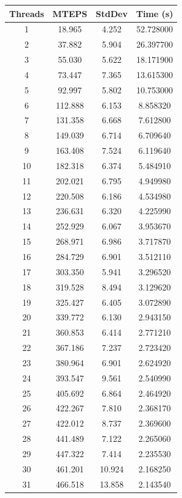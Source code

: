 \documentclass[10pt,twocolumn,letterpaper]{article}
\begin{document}
\begin{table}[h]
\renewcommand\arraystretch{0.8}
\centering
\begin{tabular}{@{}c|ccc@{}}
\toprule
Threads          & MTEPS  & StdDev     & Time (s)      \\ \midrule
1 & 18.965 & 4.252 & 52.728000 \\
2 & 37.882 & 5.904 & 26.397700 \\
3 & 55.030 & 5.622 & 18.171900 \\
4 & 73.447 & 7.365 & 13.615300 \\
5 & 92.997 & 5.802 & 10.753000 \\
6 & 112.888 & 6.153 & 8.858320 \\
7 & 131.358 & 6.668 & 7.612800 \\
8 & 149.039 & 6.714 & 6.709640 \\
9 & 163.408 & 7.524 & 6.119640 \\
10 & 182.318 & 6.374 & 5.484910 \\
11 & 202.021 & 6.795 & 4.949980 \\
12 & 220.508 & 6.186 & 4.534980 \\
13 & 236.631 & 6.320 & 4.225990 \\
14 & 252.929 & 6.067 & 3.953670 \\
15 & 268.971 & 6.986 & 3.717870 \\
16 & 284.729 & 6.901 & 3.512110 \\
17 & 303.350 & 5.941 & 3.296520 \\
18 & 319.528 & 8.494 & 3.129620 \\
19 & 325.427 & 6.405 & 3.072890 \\
20 & 339.772 & 6.130 & 2.943150 \\
21 & 360.853 & 6.414 & 2.771210 \\
22 & 367.186 & 7.237 & 2.723420 \\
23 & 380.964 & 6.901 & 2.624920 \\
24 & 393.547 & 9.561 & 2.540990 \\
25 & 405.692 & 6.864 & 2.464920 \\
26 & 422.267 & 7.810 & 2.368170 \\
27 & 422.012 & 8.737 & 2.369600 \\
28 & 441.489 & 7.122 & 2.265060 \\
29 & 447.322 & 7.414 & 2.235530 \\
30 & 461.201 & 10.924 & 2.168250 \\
31 & 466.518 & 13.858 & 2.143540 \\

\end{tabular}
\end{table}
\end{document}
